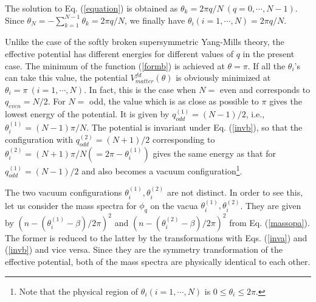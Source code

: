 \documentclass[a4paper,12pt]{article}
\begin{document}
The solution to Eq. (\ref{equation}) is obtained as 
$\theta_k=2\pi q/N~(q=0, \cdots, N-1)$.
Since $\theta_N=-\sum_{k=1}^{N-1}\theta_k=2\pi q/N$, we finally have
$\theta_i(i=1,\cdots, N)=2\pi q/N$.
\par
Unlike the case of the softly broken supersymmetric 
Yang-Mills theory, the effective potential has different energies
for different values of $q$ in the present case. 
The minimum of the function (\ref{formb})
is achieved at $\theta=\pi$. If all the $\theta_i$'s can 
take this value, the potential $V_{matter}^{fd}(\theta)$ is 
obviously minimized at $\theta_i=\pi~(i=1,\cdots, N)$. 
In fact, this is the case when $N=$ even and corresponds to $q_{even}=N/2$. 
For $N=$ odd, the value which is as close as 
possible to $\pi$ gives the lowest energy of 
the potential. It is given 
by $q_{odd}^{(1)}=(N-1)/2$, i.e., $\theta_i^{(1)}=(N-1)\pi/N$. 
The potential is invariant under Eq. (\ref{invb}), so that the configuration
with $q_{odd}^{(2)}=(N+1)/2$ corresponding to 
$\theta_i^{(2)}=(N+1)\pi/N (=2\pi-\theta_i^{(1)})$ gives the same energy 
as that for $q_{odd}^{(1)}=(N-1)/2$ and also becomes a vacuum 
configuration\footnote{Note that the physical
region of $\theta_i (i=1,\cdots, N)$ is $0\leq \theta_i \leq 2\pi$.}.
\par
The two vacuum configurations $\theta_i^{(1)}, \theta_i^{(2)}$ are
not distinct. In order to see this, let us
consider the mass spectra for $\phi_q$ on the 
vacua $\theta_i^{(1)}, \theta_i^{(2)}$. They are given by
$(n-(\theta_i^{(1)}-\beta)/2\pi)^2$ 
and $(n-(\theta_i^{(2)}-\beta)/2\pi)^2$ from Eq. (\ref{massopa}).
The former is reduced to the latter by the transformations
with Eqs. (\ref{inva}) and (\ref{invb}) and vice versa. 
Since they are the symmetry transformation of the effective potential, both 
of the mass spectra are physically identical to each other.
\par
\end{document}
